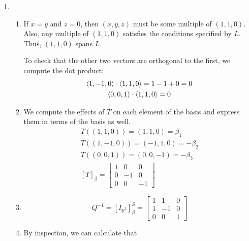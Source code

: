\documentclass[12pt]{article}
\begin{document}
\begin{enumerate}
      \item \begin{enumerate}
                  \item If $x=y$ and $z=0$, then $(x,y,z)$ must be some multiple of $(1,1,0)$.
                        Also, any multiple of $(1, 1, 0)$ satisfies the conditions specified by $L$.
                        Thus, $(1, 1, 0)$ spans $L$.

                        To check that the other two vectors are orthogonal to the first, we compute the dot product:
                        \begin{gather*}
                              \braket{1, -1, 0} \cdot \braket{1, 1, 0} = 1-1+0=0 \\
                              \braket{0, 0, 1} \cdot \braket{1, 1, 0} = 0 \\
                        \end{gather*}
                  \item We compute the effects of $T$ on each element of the basis and express them in terms of the basis as well.
                        \begin{gather*}
                              T((1, 1, 0)) = (1, 1, 0) = \beta_1 \\
                              T((1, -1, 0)) = (-1, 1, 0) = -\beta_2 \\
                              T((0, 0, 1)) = (0, 0, -1) = -\beta_3 \\
                              [T]_\beta=\begin{bmatrix}
                                    1 & 0  & 0  \\
                                    0 & -1 & 0  \\
                                    0 & 0  & -1
                              \end{bmatrix}
                        \end{gather*}
                  \item \[Q^{-1}=[I_{\mathbb{R}^3}]^S_\beta=\begin{bmatrix}
                                    1 & 1  & 0 \\
                                    1 & -1 & 0 \\
                                    0 & 0  & 1
                              \end{bmatrix}\]
                  \item By inspection, we can calculate that

\end{enumerate}
\end{enumerate}
\end{document}
